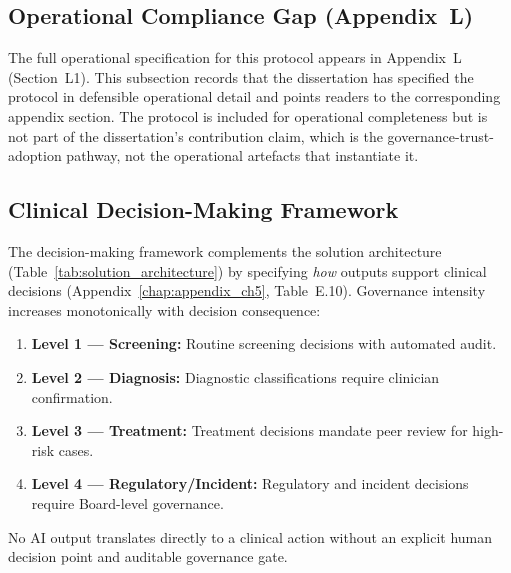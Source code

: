 \subsection{Operational Compliance Gap (Appendix~L)}

\noindent The full operational specification for this protocol appears in Appendix~L (Section~L1). This subsection records that the dissertation has specified the protocol in defensible operational detail and points readers to the corresponding appendix section. The protocol is included for operational completeness but is not part of the dissertation's contribution claim, which is the governance-trust-adoption pathway, not the operational artefacts that instantiate it.

\subsection{Clinical Decision-Making Framework}

The decision-making framework complements the solution architecture (Table~\ref{tab:solution_architecture}) by specifying \textit{how} outputs support clinical decisions (Appendix~\ref{chap:appendix_ch5}, Table~E.10). Governance intensity increases monotonically with decision consequence:

\begin{enumerate}
    \item \textbf{Level 1 --- Screening:} Routine screening decisions with automated audit.
    \item \textbf{Level 2 --- Diagnosis:} Diagnostic classifications require clinician confirmation.
    \item \textbf{Level 3 --- Treatment:} Treatment decisions mandate peer review for high-risk cases.
    \item \textbf{Level 4 --- Regulatory/Incident:} Regulatory and incident decisions require Board-level governance.
\end{enumerate}

\noindent No AI output translates directly to a clinical action without an explicit human decision point and auditable governance gate.

\iffalse


